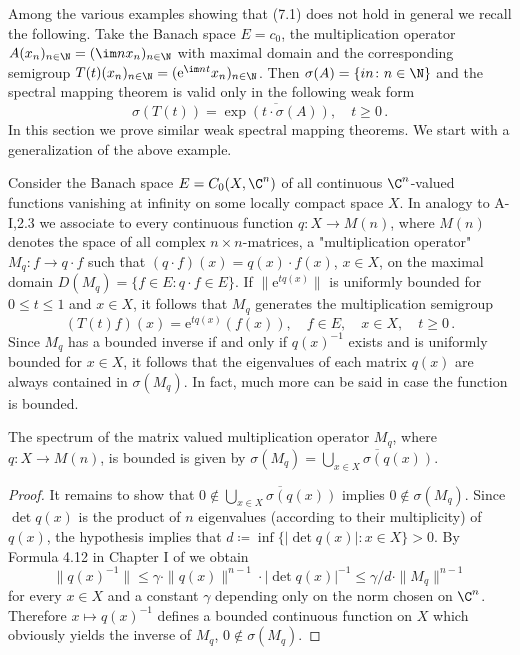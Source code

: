 Among the various examples showing that (7.1) does not hold in general we recall the following.
Take the Banach space $E = c_{0}$, the multiplication operator $A(x_{n})_{n\in\N} = (\im n x_{n})_{n\in\N}$ with maximal domain and the corresponding semigroup $T(t)(x_{n})_{n \in \N} = 
(\mathrm{e}^{\im nt}x_{n})_{n \in \N}$.
Then $\sigma(A) = \{in \colon n \in \N\}$ and the spectral mapping theorem is valid only in the following weak form
\begin{equation}\label{eq:a3-7.2}
\sigma(T(t)) = \overline{\exp(t\cdot\sigma(A))}, \quad t \geq 0\,.
\end{equation}
In this section we prove similar weak spectral mapping theorems.
We start with a generalization of the above example.

Consider the Banach space $E = C_{0}(X,\C^{n})$ of all continuous $\C^{n}$-valued functions vanishing at infinity on some locally compact space $X$.
In analogy to A-I,2.3 we associate to every continuous function $q \colon X \to M(n)$, where $M(n)$ denotes the space of all complex $n\times n$-matrices, a "multiplication operator" $M_{q} \colon f \to q\cdot f$ such that $(q\cdot f)(x) = q(x)\cdot f(x)$, $x \in X$, on the maximal domain $D(M_{q}) = \{f \in E \colon q\cdot f \in E\}$.
If $\|\mathrm{e}^{tq(x)}\|$ is uniformly bounded for $0 \leq t \leq 1$ and $x \in X$, it follows that $M_{q}$ generates the multiplication semigroup
\[
(T(t)f)(x) = \mathrm{e}^{tq(x)}(f(x)), \quad f \in E, \quad x \in X, \quad t \geq 0\,.
\]
Since $M_{q}$ has a bounded inverse if and only if $q(x)^{-1}$ exists and is uniformly bounded for $x \in X$, it follows that the eigenvalues of each matrix $q(x)$ are always contained in $\sigma(M_{q})$.
In fact, much more can be said in case the function is bounded.
\begin{lemma}\label{lem:a3-7.1}
The spectrum of the matrix valued multiplication operator $M_{q}$, where $q \colon X \to M(n)$, is bounded is given by $\sigma(M_{q}) = \overline{\bigcup_{x\in X} \sigma(q(x))}$.
\end{lemma}
\begin{proof}
It remains to show that $0 \notin \overline{\bigcup_{x\in X} \sigma(q(x))}$ implies $0 \notin \sigma(M_{q})$.
Since $\det q(x)$ is the product of $n$ eigenvalues (according to their multiplicity) of $q(x)$, the hypothesis implies that $d \coloneqq \inf\{|\det q(x)| \colon x \in X\} > 0$.
By Formula 4.12 in Chapter I of \citet{kato:1966} we obtain
\[
\|q(x)^{-1}\| \leq \gamma \cdot \|q(x)\|^{n-1} \cdot |\det q(x)|^{-1} \leq \gamma/d \cdot \|M_{q}\|^{n-1}
\]
for every $x \in X$ and a constant $\gamma$ depending only on the norm chosen on $\C^{n}$.
Therefore $x \mapsto q(x)^{-1}$ defines a bounded continuous function on $X$ which obviously yields the inverse of $M_{q}$, \ie $0 \notin \sigma(M_{q})$.
\end{proof}

